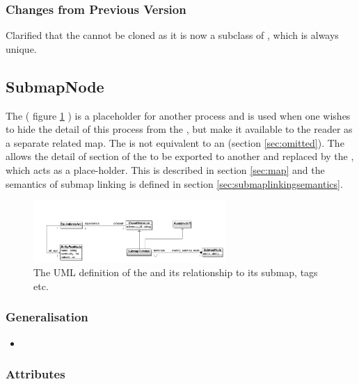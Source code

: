 \subsubsection{Changes from Previous Version}

Clarified that the  cannot be cloned as it is now
a subclass of , which is always unique.


\subsection{SubmapNode}
\label{sec:submap}\label{defn:SubmapNode}

The  ( figure \ref{fig:submapnodeuml} ) is a
placeholder for another process and is used when one wishes to hide
the detail of this process from the \PDm, but make it available to the
reader as a separate related map. The  is not
equivalent to an  (section
\ref{sec:omitted}). The  allows the detail of
section of the \PDm to be exported to another \PDm and replaced by the
, which acts as a place-holder.  This is
described in section \ref{sec:map} and the semantics of submap linking
is defined in section \ref{sec:submaplinkingsemantics}.

\begin{figure}[htb]
  \centering
  \includegraphics[width = 0.65\textwidth]{images/submapnodeuml}
  \caption{The UML definition of the  and its
   relationship to its submap, tags etc.}
  \label{fig:submapnodeuml}
\end{figure}

\subsubsection{Generalisation}

\begin{itemize}
\item {}
\end{itemize}

\subsubsection{Attributes}

